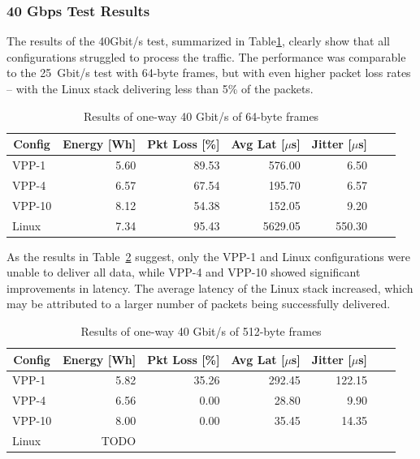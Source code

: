 \subsubsection{40 Gbps Test Results}

The results of the 40Gbit/s test, summarized in Table\ref{tab:40udp:64B}, clearly show that all configurations struggled to process the traffic.
The performance was comparable to the 25~Gbit/s test with 64-byte frames, but with even higher packet loss rates -- with the Linux stack delivering less than 5\% of the packets.

\begin{table}[h!]
\centering
\caption{Results of one-way 40 Gbit/s of 64-byte frames}
\begin{tabular}{|l|r|r|r|r|r|r|}
\hline
\multicolumn{1}{|c|}{\textbf{Config}} &
\multicolumn{1}{c|}{\textbf{Energy [Wh] }} &
\multicolumn{1}{c|}{\textbf{Pkt Loss [\%]}} &
\multicolumn{1}{c|}{\textbf{Avg Lat [$\mu$s]}} &
\multicolumn{1}{c|}{\textbf{Jitter [$\mu$s]}} \\
\hline 
VPP-1 & 5.60 & 89.53 & 576.00 & 6.50 \\
VPP-4 & 6.57 & 67.54 & 195.70 & 6.57 \\
VPP-10 & 8.12 & 54.38 & 152.05 & 9.20 \\
Linux & 7.34 & 95.43 & 5629.05 & 550.30 \\
\hline
\end{tabular}
\label{tab:40udp:64B}
\end{table}

As the results in Table~\ref{tab:40udp:512B} suggest, only the VPP-1 and Linux configurations were unable to deliver all data,
while VPP-4 and VPP-10 showed significant improvements in latency.
The average latency of the Linux stack increased, which may be attributed to a larger number of packets being successfully delivered.

\begin{table}[h!]
\centering
\caption{Results of one-way 40 Gbit/s of 512-byte frames}
\begin{tabular}{|l|r|r|r|r|r|r|}
\hline
\multicolumn{1}{|c|}{\textbf{Config}} &
\multicolumn{1}{c|}{\textbf{Energy [Wh] }} &
\multicolumn{1}{c|}{\textbf{Pkt Loss [\%]}} &
\multicolumn{1}{c|}{\textbf{Avg Lat [$\mu$s]}} &
\multicolumn{1}{c|}{\textbf{Jitter [$\mu$s]}} \\
\hline 
VPP-1 & 5.82 & 35.26 & 292.45 & 122.15 \\
VPP-4 & 6.56 & 0.00 & 28.80 & 9.90 \\
VPP-10 & 8.00 & 0.00 & 35.45 & 14.35 \\
Linux & TODO &  &  &  \\
\hline
\end{tabular}
\label{tab:40udp:512B}
\end{table}

